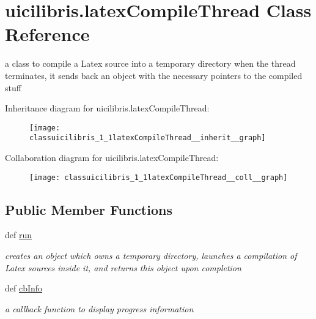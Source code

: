 \hypertarget{classuicilibris_1_1latexCompileThread}{\section{uicilibris.\-latex\-Compile\-Thread \-Class \-Reference}
\label{classuicilibris_1_1latexCompileThread}
}


a class to compile a \-Latex source into a temporary directory when the thread terminates, it sends back an object with the necessary pointers to the compiled stuff  




\-Inheritance diagram for uicilibris.\-latex\-Compile\-Thread\-:
\nopagebreak
\begin{figure}[H]
\begin{center}
\leavevmode
\texttt{[image: classuicilibris\_1\_1latexCompileThread\_\_inherit\_\_graph]}
\end{center}
\end{figure}


\-Collaboration diagram for uicilibris.\-latex\-Compile\-Thread\-:
\nopagebreak
\begin{figure}[H]
\begin{center}
\leavevmode
\texttt{[image: classuicilibris\_1\_1latexCompileThread\_\_coll\_\_graph]}
\end{center}
\end{figure}
\subsection*{\-Public \-Member \-Functions}
\begin{DoxyCompactItemize}
\item 
def \hyperlink{classuicilibris_1_1latexCompileThread_a96c9b7bd10cb6c01422d7f1c11f7b3e1}{run}
\begin{DoxyCompactList}\small\item\em creates an object which owns a temporary directory, launches a compilation of \-Latex sources inside it, and returns this object upon completion \end{DoxyCompactList}\item 
def \hyperlink{classuicilibris_1_1latexCompileThread_af1ca34e7c4db9ef4eabb1c3d660fa032}{cb\-Info}
\begin{DoxyCompactList}\small\item\em a callback function to display progress information \end{DoxyCompactList}\end{DoxyCompactItemize}


